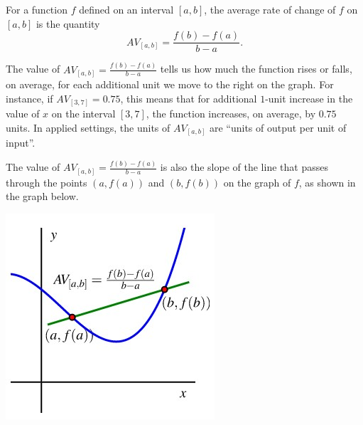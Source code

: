 \documentclass[nooutcomes]{ximera}
\begin{document}
\begin{summary}
\item For a function \(f\) defined on an interval \([a,b]\), the average rate of change of \(f\) on \([a,b]\) is the quantity%
\begin{equation*}
AV_{[a,b]} = \frac{f(b) - f(a)}{b-a}\text{.}
\end{equation*}
\item The value of \(AV_{[a,b]} = \frac{f(b) - f(a)}{b-a}\) tells us how much the function rises or falls, on average, for each additional unit we move to the right on the graph.  For instance, if \(AV_{[3,7]} = 0.75\), this means that for additional \(1\)-unit increase in the value of \(x\) on the interval \([3,7]\), the function increases, on average, by \(0.75\) units.  In applied settings, the units of \(AV_{[a,b]}\) are ``units of output per unit of input''.
\item The value of \(AV_{[a,b]} = \frac{f(b) - f(a)}{b-a}\) is also the slope of the line that passes through the points \((a,f(a))\) and \((b,f(b))\) on the graph of \(f\), as shown in the graph below.
\begin{image}
\includegraphics{ARoCtext3.jpg}
\end{image}

\end{summary}
\end{document}
